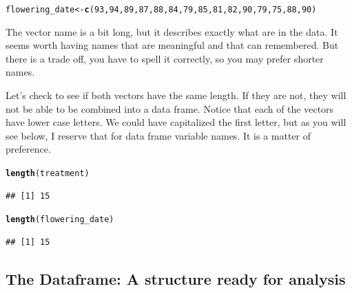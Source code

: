 \documentclass{tufte-handout}\usepackage[]{graphicx}\usepackage[]{xcolor}
\makeatletter
\newcommand{\hlnum}[1]{\textcolor[rgb]{0.686,0.059,0.569}{#1}}%
\newcommand{\hlstd}[1]{\textcolor[rgb]{0.345,0.345,0.345}{#1}}%
\newcommand{\hlkwb}[1]{\textcolor[rgb]{0.69,0.353,0.396}{#1}}%
\newcommand{\hlkwd}[1]{\textcolor[rgb]{0.737,0.353,0.396}{\textbf{#1}}}%
\newenvironment{kframe}{%
 \def\at@end@of@kframe{}%
 \ifinner\ifhmode%
  \def\at@end@of@kframe{\end{minipage}}%
  \begin{minipage}{\columnwidth}%
 \fi\fi%
 \def\FrameCommand##1{\hskip\@totalleftmargin \hskip-\fboxsep
 \colorbox{shadecolor}{##1}\hskip-\fboxsep
     \hskip-\linewidth \hskip-\@totalleftmargin \hskip\columnwidth}%
 \MakeFramed {\advance\hsize-\width
   \@totalleftmargin\z@ \linewidth\hsize
   \@setminipage}}%
 {\par\unskip\endMakeFramed%
 \at@end@of@kframe}
\newenvironment{knitrout}{}{} %
\makeatother
\begin{document}
\begin{fullwidth}
\begin{knitrout}
\color{fgcolor}\begin{kframe}
\begin{alltt}
\hlstd{flowering_date} \hlkwb{<-} \hlkwd{c}\hlstd{(}\hlnum{93}\hlstd{,} \hlnum{94}\hlstd{,} \hlnum{89}\hlstd{,} \hlnum{87}\hlstd{,} \hlnum{88}\hlstd{,} \hlnum{84}\hlstd{,} \hlnum{79}\hlstd{,} \hlnum{85}\hlstd{,} \hlnum{81}\hlstd{,} \hlnum{82}\hlstd{,} \hlnum{90}\hlstd{,} \hlnum{79}\hlstd{,} \hlnum{75}\hlstd{,} \hlnum{88}\hlstd{,} \hlnum{90}\hlstd{)}
\end{alltt}
\end{kframe}
\end{knitrout}
\end{fullwidth}



The vector name is a bit long, but it describes exactly what are in the data. It seems worth having names that are meaningful and that can remembered. But there is a trade off, you have to spell it correctly, so you may prefer shorter names. 

Let's check to see if both vectors have the same length. If they are not, they will not be able to be combined into a data frame. Notice that each of the vectors have lower case letters. We could have capitalized the first letter, but as you will see below, I reserve that for data frame variable names. It is a matter of preference.

\begin{knitrout}
\color{fgcolor}\begin{kframe}
\begin{alltt}
\hlkwd{length}\hlstd{(treatment)}
\end{alltt}
\begin{verbatim}
## [1] 15
\end{verbatim}
\begin{alltt}
\hlkwd{length}\hlstd{(flowering_date)}
\end{alltt}
\begin{verbatim}
## [1] 15
\end{verbatim}
\end{kframe}
\end{knitrout}

\subsection{The Dataframe: A structure ready for analysis}
\end{document}
